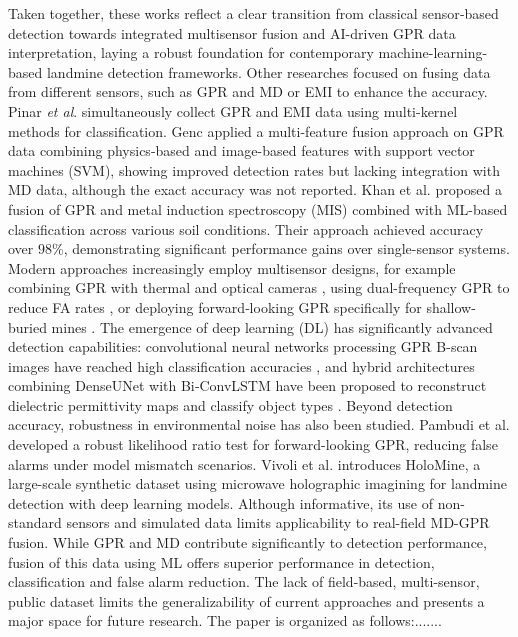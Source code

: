 \documentclass{ieeeaccess}
\begin{document}
Taken together, these works reflect a clear transition from classical sensor‑based detection towards integrated multisensor fusion and AI-driven GPR data interpretation, laying a robust foundation for contemporary machine-learning-based landmine detection frameworks.
Other researches focused on fusing data from different sensors, such as GPR and MD or EMI to enhance the accuracy.  Pinar \textit{et al}. \cite{Pinar2015} simultaneously collect GPR and EMI data using multi-kernel methods for classification. Genc \cite{Genc2019} applied a multi-feature fusion approach on GPR data combining physics-based and image-based features with support vector machines (SVM), showing improved detection rates but lacking integration with MD data, although the exact accuracy was not reported. Khan et al. \cite{Khan2024} proposed a fusion of GPR and metal induction spectroscopy (MIS) combined with ML-based classification across various soil conditions. Their approach achieved accuracy over $98\%$, demonstrating significant performance gains over single-sensor systems.
Modern approaches increasingly employ multisensor designs, for example combining GPR with thermal and optical cameras \cite{Florez-Lozano2020}, using dual-frequency GPR to reduce FA rates \cite{Garcia-Fernandez2021}, or deploying forward‑looking GPR specifically for shallow-buried mines \cite{Pambudi2021}. The emergence of deep learning (DL) has significantly advanced detection capabilities: convolutional neural networks processing GPR B-scan images have reached high classification accuracies \cite{Wang2022}, and hybrid architectures combining DenseUNet with Bi‑ConvLSTM have been proposed to reconstruct dielectric permittivity maps and classify object types \cite{Wang2021}. 
Beyond detection accuracy, robustness in environmental noise has also been studied. Pambudi et al. \cite{Pambudi2020} developed a robust likelihood ratio test for forward-looking GPR, reducing false alarms under model mismatch scenarios. Vivoli et al. \cite{Vivoli2025} introduces HoloMine, a large-scale synthetic dataset using microwave holographic imagining for landmine detection with deep learning models. Although informative, its use of non-standard sensors and simulated data limits applicability to real-field MD-GPR fusion. While GPR and MD contribute significantly to detection performance, fusion of this data using ML offers superior performance in detection, classification and false alarm reduction. The lack of field-based, multi-sensor, public dataset limits the generalizability of current approaches and presents a major space for future research.
The paper is organized as follows:.......
\end{document}
